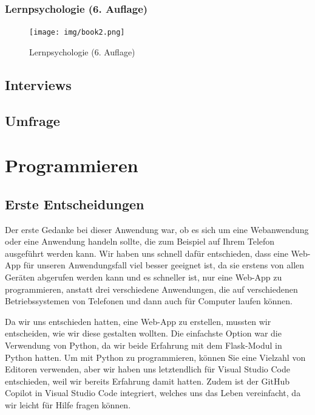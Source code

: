 \documentclass[12pt,a4paper]{report}
\begin{document}
\subsection{Lernpsychologie (6. Auflage)}
\begin{figure}[H]
    \centering
    \texttt{[image: img/book2.png]}
    \caption{Lernpsychologie (6. Auflage)}
\end{figure}



\section{Interviews}

\section{Umfrage}


\chapter{Programmieren}
\section{Erste Entscheidungen}
Der erste Gedanke bei dieser Anwendung war, ob es sich um eine Webanwendung oder eine Anwendung handeln sollte, die zum Beispiel auf Ihrem Telefon ausgeführt werden kann. Wir haben uns schnell dafür entschieden, dass eine Web-App für unseren Anwendungsfall viel besser geeignet ist, da sie erstens von allen Geräten abgerufen werden kann und es schneller ist, nur eine Web-App zu programmieren, anstatt drei verschiedene Anwendungen, die auf verschiedenen Betriebssystemen von Telefonen und dann auch für Computer laufen können.

Da wir uns entschieden hatten, eine Web-App zu erstellen, mussten wir entscheiden, wie wir diese gestalten wollten. Die einfachste Option war die Verwendung von Python, da wir beide Erfahrung mit dem Flask-Modul in Python hatten. Um mit Python zu programmieren, können Sie eine Vielzahl von Editoren verwenden, aber wir haben uns letztendlich für Visual Studio Code entschieden, weil wir bereits Erfahrung damit hatten. Zudem ist der GitHub Copilot in Visual Studio Code integriert, welches uns das Leben vereinfacht, da wir leicht für Hilfe fragen können.
\end{document}
